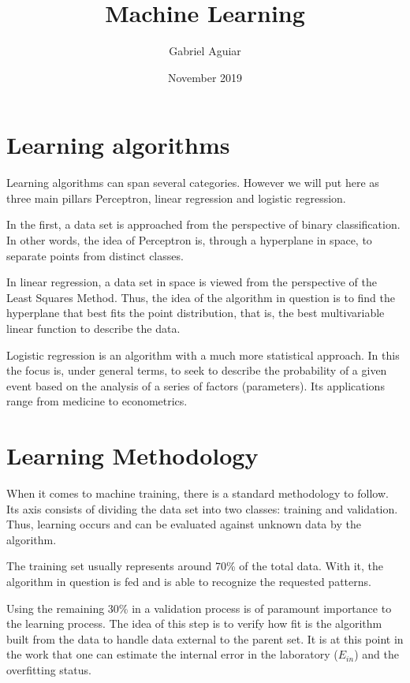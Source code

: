 \documentclass{article}
\title{Machine Learning}
\author{Gabriel Aguiar}
\date{November 2019}
\begin{document}
\maketitle

\section{Learning algorithms}

\hfill

Learning algorithms can span several categories. However we will put here as three main pillars Perceptron, linear regression and logistic regression.

\hfill

In the first, a data set is approached from the perspective of binary classification. In other words, the idea of Perceptron is, through a hyperplane in space, to separate points from distinct classes.

\hfill

In linear regression, a data set in space is viewed from the perspective of the Least Squares Method. Thus, the idea of the algorithm in question is to find the hyperplane that best fits the point distribution, that is, the best multivariable linear function to describe the data.

\hfill

Logistic regression is an algorithm with a much more statistical approach. In this the focus is, under general terms, to seek to describe the probability of a given event based on the analysis of a series of factors (parameters). Its applications range from medicine to econometrics.

\section{Learning Methodology}

\hfill

When it comes to machine training, there is a standard methodology to follow. Its axis consists of dividing the data set into two classes: training and validation. Thus, learning occurs and can be evaluated against unknown data by the algorithm.

\hfill

The training set usually represents around 70\% of the total data. With it, the algorithm in question is fed and is able to recognize the requested patterns.

\newpage

Using the remaining 30\% in a validation process is of paramount importance to the learning process. The idea of this step is to verify how fit is the algorithm built from the data to handle data external to the parent set. It is at this point in the work that one can estimate the internal error in the laboratory ($E_{in}$) and the overfitting status.
\end{document}
